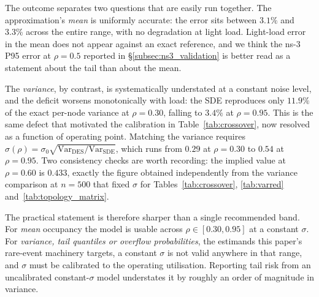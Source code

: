 \documentclass{ieeeaccess}
\begin{document}
The outcome separates two questions that are easily run together. The
approximation's \emph{mean} is uniformly accurate: the error sits between $3.1\%$ and $3.3\%$
across the entire range, with no degradation at light load. Light-load error in the mean does not
appear against an exact reference, and we think the ns-3 P95 error
at $\rho{=}0.5$ reported in \S\ref{subsec:ns3_validation} is better read as a statement about
the tail than about the mean.

The \emph{variance}, by contrast, is systematically understated at a constant noise level, and
the deficit worsens monotonically with load: the SDE reproduces only $11.9\%$ of the exact
per-node variance at $\rho{=}0.30$, falling to $3.4\%$ at $\rho{=}0.95$. This is the same defect
that motivated the calibration in Table~\ref{tab:crossover}, now resolved as a function of
operating point. Matching the variance requires
$\sigma(\rho)=\sigma_0\sqrt{\mathrm{Var}_{\mathrm{DES}}/\mathrm{Var}_{\mathrm{SDE}}}$, which runs
from $0.29$ at $\rho{=}0.30$ to $0.54$ at $\rho{=}0.95$. Two consistency checks are worth
recording: the implied value at $\rho{=}0.60$ is $0.433$, exactly the figure obtained
independently from the variance comparison at $n{=}500$ that fixed $\sigma$ for
Tables~\ref{tab:crossover}, \ref{tab:varred} and~\ref{tab:topology_matrix}.

The practical statement is therefore sharper than a single recommended band. For \emph{mean}
occupancy the model is usable across $\rho\in[0.30,0.95]$ at a constant $\sigma$. For
\emph{variance, tail quantiles or overflow probabilities}, the estimands this paper's
rare-event machinery targets, a constant $\sigma$ is not valid anywhere in that range, and
$\sigma$ must be calibrated to the operating utilisation. Reporting tail risk from an
uncalibrated constant-$\sigma$ model understates it by roughly an order of magnitude in variance.
\end{document}
